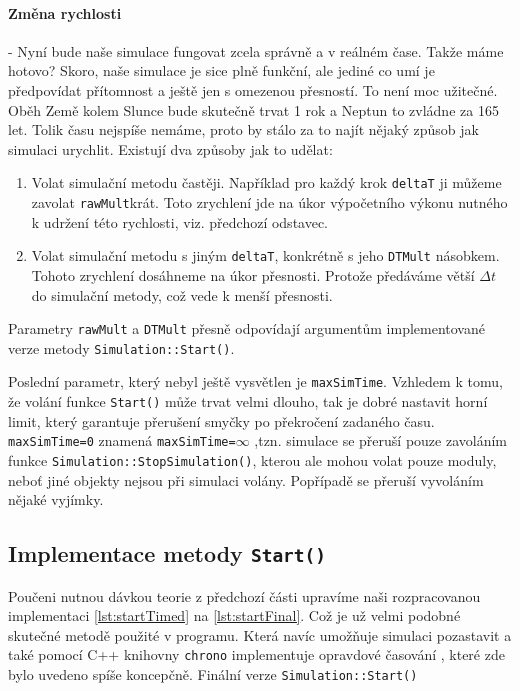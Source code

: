 \paragraph{Změna rychlosti} - Nyní bude naše simulace fungovat zcela správně a v reálném čase. Takže máme hotovo? Skoro, naše simulace je sice plně funkční, ale jediné co umí je předpovídat přítomnost a ještě jen s omezenou přesností. To není moc užitečné. Oběh Země kolem Slunce bude skutečně trvat 1 rok a Neptun to zvládne za 165 let. Tolik času nejspíše nemáme, proto by stálo za to najít nějaký způsob jak simulaci urychlit. Existují dva způsoby jak to udělat:
\begin{enumerate}
	\item Volat simulační metodu častěji. Například pro každý krok \texttt{deltaT} ji můžeme zavolat \texttt{rawMult}krát. Toto zrychlení jde na úkor výpočetního výkonu nutného k udržení této rychlosti, viz. předchozí odstavec.
	\item Volat simulační metodu s jiným \texttt{deltaT}, konkrétně s jeho \texttt{DTMult} násobkem. Tohoto zrychlení dosáhneme na úkor přesnosti. Protože předáváme větší $ \Delta t $ do simulační metody, což vede k menší přesnosti.
\end{enumerate}
Parametry \texttt{rawMult} a \texttt{DTMult} přesně odpovídají argumentům implementované verze metody \texttt{Simulation::Start()}.

Poslední parametr, který nebyl ještě vysvětlen je \texttt{maxSimTime}. Vzhledem k tomu, že volání funkce \texttt{Start()} může trvat velmi dlouho, tak je dobré nastavit horní limit, který garantuje přerušení smyčky po překročení zadaného času. \texttt{maxSimTime=0} znamená \texttt{maxSimTime=$ \infty $} ,tzn. simulace se přeruší pouze zavoláním funkce \texttt{Simulation::StopSimulation()}, kterou ale mohou volat pouze moduly, neboť jiné objekty nejsou při simulaci volány.
Popřípadě se přeruší vyvoláním nějaké vyjímky.

\subsection{Implementace metody \texttt{Start()}}
Poučeni nutnou dávkou teorie z předchozí části upravíme naši rozpracovanou implementaci \ref{lst:startTimed} na \ref{lst:startFinal}. Což je už velmi podobné skutečné metodě použité v programu. Která navíc umožňuje simulaci pozastavit a také pomocí C++ knihovny \texttt{chrono} implementuje opravdové časování , které zde bylo uvedeno spíše koncepčně.
{Finální verze \texttt{Simulation::Start()}}

